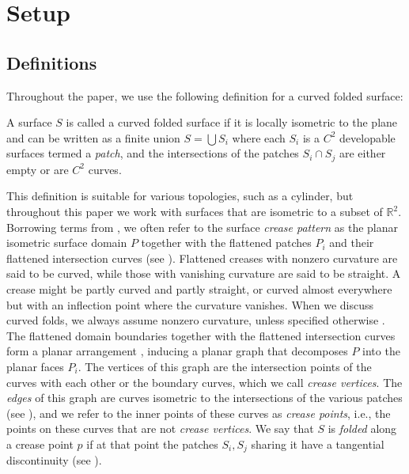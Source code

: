 
\section{Setup} \label{sec:setup}
\subsection{Definitions}
Throughout the paper, we use the following definition for a curved folded surface:
\begin{definition} \label{def:curved_folded_surface}
A surface $S$ is called a curved folded surface if it is locally isometric to the plane and can be written as a finite union $S = \bigcup S_i $ where each $S_i$ is a $C^2$ developable surfaces termed a \emph{patch}, and the intersections of the patches $S_i \cap S_j$ are either empty or are $C^2$ curves.
\end{definition}
This definition is suitable for various topologies, such as a cylinder, but throughout this paper we work with surfaces that are isometric to a subset of $\mathbb{R}^2$. Borrowing terms from \cite{origami_book,non_pleated}, we often refer to the surface \emph{crease pattern} as the planar isometric surface domain $P$ together with the flattened patches $P_i$ and their flattened intersection curves (see ). Flattened creases with nonzero curvature are said to be curved, while those with vanishing curvature are said to be straight. A crease might be partly curved and partly straight, or curved almost everywhere but with an inflection point where the curvature vanishes. When we discuss curved folds, we always assume nonzero curvature, unless specified otherwise . The flattened domain boundaries together with the flattened intersection curves form a planar arrangement \cite{arrangements}, inducing a planar graph that decomposes $P$ into the planar faces $P_i$. The vertices of this graph are the intersection points of the curves with each other or the boundary curves, which we call \emph{crease vertices}. The \emph{edges} of this graph are curves isometric to the intersections of the various patches (see ), and we refer to the inner points of these curves as \emph{crease points}, i.e., the points on these curves that are not \textit{crease vertices}. We say that $S$ is \emph{folded} along a crease point $p$ if at that point the patches $S_i,S_j$ sharing it have a tangential discontinuity (see ).

